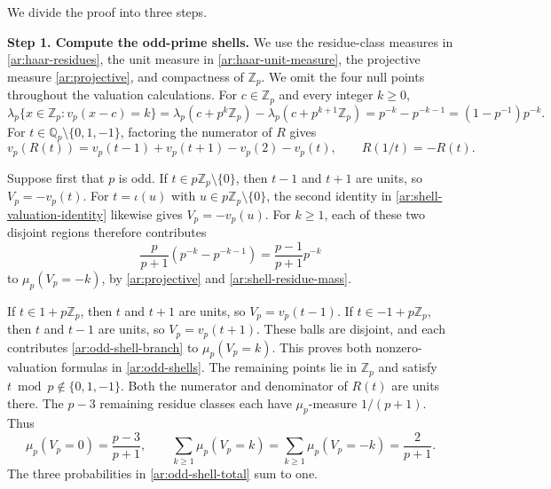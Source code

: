 \documentclass[twoside]{aomart}
\makeatletter
\theoremstyle{paperplain}
\theoremstyle{paperdefinition}
\renewenvironment{proof}[1][\proofname]{\par\pushQED{\qed}%
  \normalfont\topsep6\p@\@plus3\p@\relax\trivlist
  \item[\hskip\labelsep\itshape #1\@addpunct{.}]\ignorespaces
}{\popQED\endtrivlist\@endpefalse}
\newcommand{\Z}{\mathbb Z}
\newcommand{\Q}{\mathbb Q}
\numberwithin{equation}{section}
\makeatother
\begin{document}
\begin{proof}
We divide the proof into three steps.
\par
\medskip
\noindent\textbf{Step 1. Compute the odd-prime shells.}
We use the residue-class measures in \eqref{ar:haar-residues},
the unit measure in \eqref{ar:haar-unit-measure},
the projective measure \eqref{ar:projective}, and
compactness of $\Z_p$. We omit the four null points
throughout the valuation calculations. For $c\in\Z_p$ and every
integer $k\ge0$,
\begin{equation}
 \lambda_p\{x\in\Z_p:v_p(x-c)=k\}=\lambda_p(c+p^k\Z_p)-\lambda_p(c+p^{k+1}\Z_p)=p^{-k}-p^{-k-1}=(1-p^{-1})p^{-k}.
 \label{ar:shell-residue-mass}
\end{equation}
For $t\in\Q_p\setminus\{0,1,-1\}$, factoring the numerator
of $R$ gives
\begin{equation}
 v_p(R(t))=v_p(t-1)+v_p(t+1)-v_p(2)-v_p(t),\qquad R(1/t)=-R(t).
 \label{ar:shell-valuation-identity}
\end{equation}

Suppose first that $p$ is odd. If $t\in p\Z_p\setminus\{0\}$,
then $t-1$ and $t+1$ are units, so $V_p=-v_p(t)$.
For $t=\iota(u)$ with $u\in p\Z_p\setminus\{0\}$,
the second identity in \eqref{ar:shell-valuation-identity}
likewise gives $V_p=-v_p(u)$. For $k\ge1$, each of
these two disjoint regions therefore contributes
\begin{equation}
 \frac p{p+1}(p^{-k}-p^{-k-1})
   =\frac{p-1}{p+1}p^{-k}
 \label{ar:odd-shell-branch}
\end{equation}
to $\mu_p(V_p=-k)$, by \eqref{ar:projective} and
\eqref{ar:shell-residue-mass}.

If $t\in1+p\Z_p$, then $t$ and $t+1$ are units,
so $V_p=v_p(t-1)$. If $t\in-1+p\Z_p$, then $t$ and
$t-1$ are units, so $V_p=v_p(t+1)$. These balls are
disjoint, and each contributes \eqref{ar:odd-shell-branch}
to $\mu_p(V_p=k)$. This proves both nonzero-valuation
formulas in \eqref{ar:odd-shells}. The remaining points
lie in $\Z_p$ and satisfy $t\bmod p\notin\{0,1,-1\}$.
Both the
numerator and denominator of $R(t)$ are units there.
The $p-3$ remaining residue classes each have
$\mu_p$-measure $1/(p+1)$. Thus
\begin{equation}
 \mu_p(V_p=0)=\frac{p-3}{p+1},\qquad
 \sum_{k\ge1}\mu_p(V_p=k)
  =\sum_{k\ge1}\mu_p(V_p=-k)=\frac2{p+1}.
 \label{ar:odd-shell-total}
\end{equation}
The three probabilities in \eqref{ar:odd-shell-total}
sum to one.


\end{proof}
\end{document}
